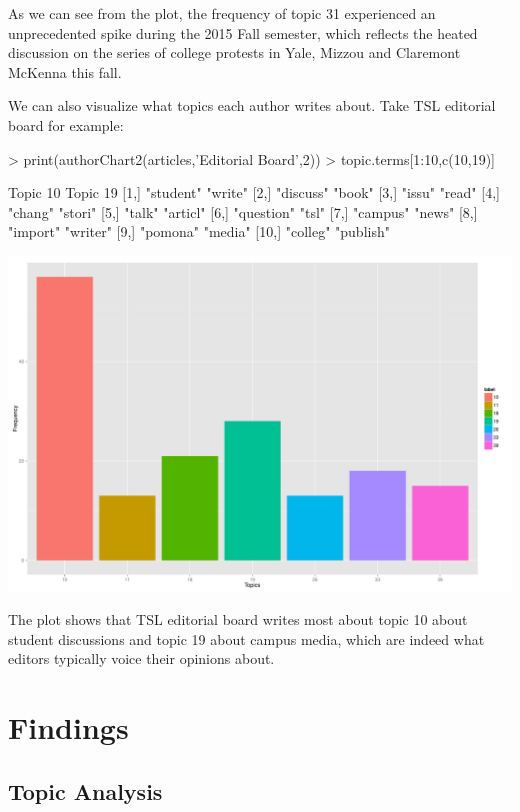 \documentclass[a4paper]{article}
\begin{document}
As we can see from the plot, the frequency of topic 31 experienced an unprecedented spike during the 2015 Fall semester, which reflects the heated discussion on the series of college protests in Yale, Mizzou and Claremont McKenna this fall.

We can also visualize what topics each author writes about. Take TSL editorial board for example: 

\begin{Schunk}
\begin{Sinput}
> print(authorChart2(articles,'Editorial Board',2))
> topic.terms[1:10,c(10,19)]
\end{Sinput}
\begin{Soutput}
      Topic 10   Topic 19 
 [1,] "student"  "write"  
 [2,] "discuss"  "book"   
 [3,] "issu"     "read"   
 [4,] "chang"    "stori"  
 [5,] "talk"     "articl" 
 [6,] "question" "tsl"    
 [7,] "campus"   "news"   
 [8,] "import"   "writer" 
 [9,] "pomona"   "media"  
[10,] "colleg"   "publish"
\end{Soutput}
\end{Schunk}
\includegraphics{FinalProject-006}

The plot shows that TSL editorial board writes most about topic 10 about student discussions and topic 19 about campus media, which are indeed what editors typically voice their opinions about. 

\section{Findings}

\subsection{Topic Analysis}
\end{document}
